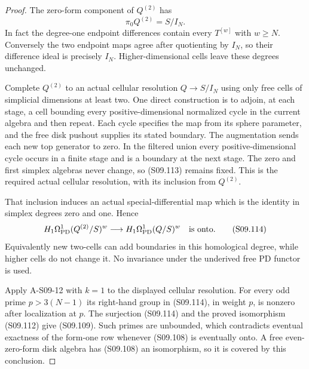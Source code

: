 \begin{proof}
The zero-form component of $Q^{(2)}$ has
\[
                             \pi_0Q^{(2)}=S/I_N.
 \tag{S09.113}
\]
In fact the degree-one endpoint differences contain
every $T^{[w]}$ with $w\geq N$.  Conversely the two
endpoint maps agree after quotienting by $I_N$, so
their difference ideal is precisely $I_N$.
Higher-dimensional cells leave these degrees unchanged.

Complete $Q^{(2)}$ to an actual cellular resolution
$Q\to S/I_N$ using only free cells of simplicial
dimensions at least two.  One direct construction is
to adjoin, at each stage, a cell bounding every
positive-dimensional normalized cycle in the current
algebra and then repeat.  Each cycle specifies the
map from its sphere parameter, and the free disk
pushout supplies its stated boundary.  The augmentation
sends each new top generator to zero.  In the filtered
union every positive-dimensional cycle occurs in a
finite stage and is a boundary at the next stage.
The zero and first simplex algebras never change, so
(S09.113) remains fixed.  This is the required actual
cellular resolution, with its inclusion from
$Q^{(2)}$.

That inclusion induces an actual special-differential
map which is the identity in simplex degrees zero
and one.  Hence
\[
 H_1\Omega^1_{\mathrm{PD}}(Q^{(2)}/S)^w
               \longrightarrow H_1\Omega^1_{\mathrm{PD}}(Q/S)^w
                  \quad\hbox{is onto}.             \tag{S09.114}
\]
Equivalently new two-cells can add boundaries in this
homological degree, while higher cells do not change
it.  No invariance under the underived free PD functor
is used.

Apply A-S09-12 with $k=1$ to the displayed cellular
resolution.  For every odd prime $p>3(N-1)$ its
right-hand group in (S09.114), in weight $p$, is
nonzero after localization at $p$.  The surjection
(S09.114) and the proved isomorphism (S09.112) give
(S09.109).  Such primes are unbounded, which contradicts
eventual exactness of the form-one row whenever
(S09.108) is eventually onto.  A free even-zero-form
disk algebra has (S09.108) an isomorphism, so it is
covered by this conclusion.
\end{proof}
